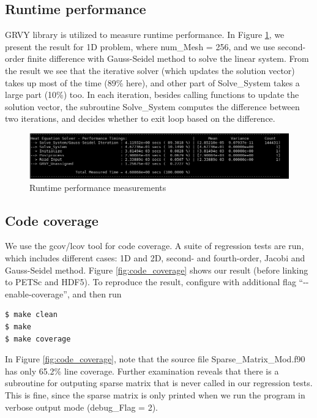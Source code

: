 \documentclass{article}
\begin{document}
\subsection{Runtime performance}
GRVY library is utilized to measure runtime performance. In Figure \ref{fig:timing}, we present the result
for 1D problem, where num\_Mesh = 256, and we use second-order finite difference with Gauss-Seidel method
to solve the linear system. From the result we see that the iterative solver (which updates the solution
vector) takes up most of the time (89\% here), and other part of Solve\_System takes a large part (10\%) too.
In each iteration, besides calling functions to update the solution vector, the subroutine Solve\_System
computes the difference between two iterations, and decides whether to exit loop based on the difference.

\begin{figure}[h]
    \centering
    \includegraphics[width=\textwidth]{timing.png}
    \caption{Runtime performance measurements}
    \label{fig:timing}
\end{figure}

\subsection{Code coverage}
We use the gcov/lcov tool for code coverage. A suite of regression tests are run, which includes different
cases: 1D and 2D, second- and fourth-order, Jacobi and Gauss-Seidel method. Figure \ref{fig:code_coverage}
shows our result (before linking to PETSc and HDF5). To reproduce the result, configure with additional flag
``-{}-enable-coverage'', and then run 
\begin{verbatim}
$ make clean
$ make
$ make coverage
\end{verbatim}

In Figure \ref{fig:code_coverage}, note that the source file Sparse\_Matrix\_Mod.f90 has only 65.2\% line
coverage. Further examination reveals that there is a subroutine for outputing sparse matrix that is never
called in our regression tests. This is fine, since the sparse matrix is only printed when we run the
program in verbose output mode (debug\_Flag = 2).
\end{document}
